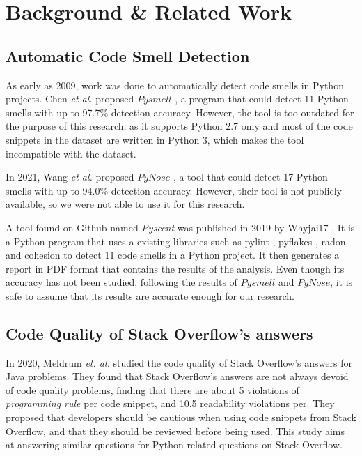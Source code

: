 
\section{Background \& Related Work}
\label{sec:related-work}
\subsection{Automatic Code Smell Detection}
\label{sec:related-work-automatic-code-smell-detection}
As early as 2009, work was done to automatically detect code smells in Python projects. Chen \textit{et al.} proposed $Pysmell$ \cite{pysmell}, a program that could detect 11 Python smells with up to 97.7\% detection accuracy. However, the tool is too outdated for the purpose of this research, as it supports Python 2.7 only and most of the code snippets in the dataset are written in Python 3, which makes the tool incompatible with the dataset.

In 2021, Wang \textit{et al.} proposed $PyNose$ \cite{pynose}, a tool that could detect 17 Python smells with up to 94.0\% detection accuracy. However, their tool is not publicly available, so we were not able to use it for this research.

A tool found on Github named \textit{Pyscent}  was published in 2019 by Whyjai17 \cite{pyscent}. It is a Python program that uses a existing libraries such as pylint \cite{pylint}, pyflakes \cite{pyflake}, radon \cite{radon} and cohesion \cite{cohesion} to detect 11 code smells in a Python project. It then generates a report in PDF format that contains the results of the analysis. Even though its accuracy has not been studied, following the results of $Pysmell$ and $PyNose$, it is safe to assume that its results are accurate enough for our research.

\subsection{Code Quality of Stack Overflow's answers}
\label{sec:related-work-code-quality-of-stack-overflow-answers}
In 2020, Meldrum \textit{et. al.} \cite{meldrum-2020} studied the code quality of Stack Overflow's answers for Java problems. They found that Stack Overflow's answers are not always devoid of code quality problems, finding that there are about 5 violations of \textit{programming rule} per code snippet, and 10.5 readability violations per. They proposed that developers should be cautious when using code snippets from Stack Overflow, and that they should be reviewed before being used. This study aims at answering similar questions for Python related questions on Stack Overflow.


